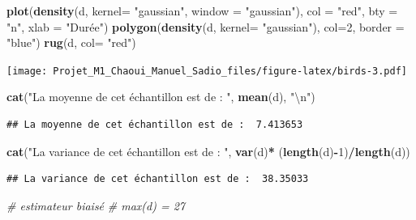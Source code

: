 \documentclass[
]{book}
\newenvironment{Shaded}{\begin{snugshade}}{\end{snugshade}}
\newcommand{\CharTok}[1]{\textcolor[rgb]{0.31,0.60,0.02}{#1}}
\newcommand{\CommentTok}[1]{\textcolor[rgb]{0.56,0.35,0.01}{\textit{#1}}}
\newcommand{\DataTypeTok}[1]{\textcolor[rgb]{0.13,0.29,0.53}{#1}}
\newcommand{\DecValTok}[1]{\textcolor[rgb]{0.00,0.00,0.81}{#1}}
\newcommand{\KeywordTok}[1]{\textcolor[rgb]{0.13,0.29,0.53}{\textbf{#1}}}
\newcommand{\NormalTok}[1]{#1}
\newcommand{\OperatorTok}[1]{\textcolor[rgb]{0.81,0.36,0.00}{\textbf{#1}}}
\newcommand{\StringTok}[1]{\textcolor[rgb]{0.31,0.60,0.02}{#1}}
\begin{document}
\begin{Shaded}
\begin{Highlighting}[]
\KeywordTok{plot}\NormalTok{(}\KeywordTok{density}\NormalTok{(d, }\DataTypeTok{kernel=} \StringTok{"gaussian"}\NormalTok{, }\DataTypeTok{window =} \StringTok{"gaussian"}\NormalTok{),}
     \DataTypeTok{col =} \StringTok{"red"}\NormalTok{, }\DataTypeTok{bty =} \StringTok{"n"}\NormalTok{, }\DataTypeTok{xlab =} \StringTok{"Durée"}\NormalTok{)}
\KeywordTok{polygon}\NormalTok{(}\KeywordTok{density}\NormalTok{(d, }\DataTypeTok{kernel=} \StringTok{"gaussian"}\NormalTok{), }\DataTypeTok{col=}\DecValTok{2}\NormalTok{, }\DataTypeTok{border =} \StringTok{"blue"}\NormalTok{)}
\KeywordTok{rug}\NormalTok{(d, }\DataTypeTok{col=} \StringTok{"red"}\NormalTok{)}
\end{Highlighting}
\end{Shaded}

\texttt{[image: Projet\_M1\_Chaoui\_Manuel\_Sadio\_files/figure-latex/birds-3.pdf]}

\begin{Shaded}
\begin{Highlighting}[]
\KeywordTok{cat}\NormalTok{(}\StringTok{"La moyenne de cet échantillon est de : "}\NormalTok{, }\KeywordTok{mean}\NormalTok{(d), }\StringTok{"}\CharTok{\textbackslash{}n}\StringTok{"}\NormalTok{)}
\end{Highlighting}
\end{Shaded}

\begin{verbatim}
## La moyenne de cet échantillon est de :  7.413653
\end{verbatim}

\begin{Shaded}
\begin{Highlighting}[]
\KeywordTok{cat}\NormalTok{(}\StringTok{"La variance de cet échantillon est de : "}\NormalTok{, }\KeywordTok{var}\NormalTok{(d)}\OperatorTok{*}\StringTok{ }\NormalTok{(}\KeywordTok{length}\NormalTok{(d)}\OperatorTok{-}\DecValTok{1}\NormalTok{)}\OperatorTok{/}\KeywordTok{length}\NormalTok{(d))}
\end{Highlighting}
\end{Shaded}

\begin{verbatim}
## La variance de cet échantillon est de :  38.35033
\end{verbatim}

\begin{Shaded}
\begin{Highlighting}[]
\CommentTok{# estimateur biaisé}
\CommentTok{# max(d) = 27}
\end{Highlighting}
\end{Shaded}
\end{document}
